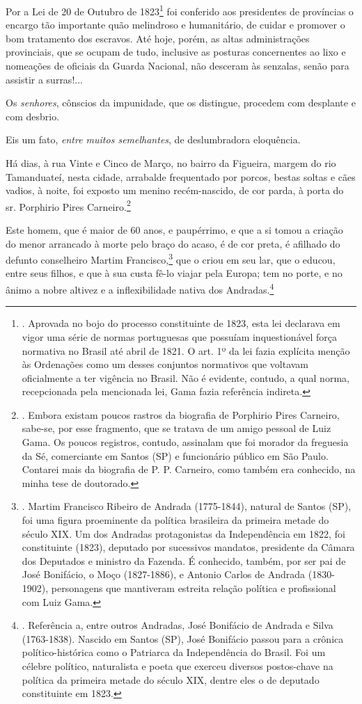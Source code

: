 Por a Lei de 20 de Outubro de 1823\footnote{. Aprovada no bojo do
  processo constituinte de 1823, esta lei declarava em vigor uma série
  de normas portuguesas que possuíam inquestionável força normativa no
  Brasil até abril de 1821. O art. 1º da lei fazia explícita menção às
  Ordenações como um desses conjuntos normativos que voltavam
  oficialmente a ter vigência no Brasil. Não é evidente, contudo, a qual
  norma, recepcionada pela mencionada lei, Gama fazia referência
  indireta.} foi conferido aos presidentes de províncias o encargo tão
importante quão melindroso e humanitário, de cuidar e promover o bom
tratamento dos escravos. Até hoje, porém, as altas administrações
provinciais, que se ocupam de tudo, inclusive as posturas concernentes
ao lixo e nomeações de oficiais da Guarda Nacional, não desceram às
senzalas, senão para assistir a surras!...

Os \emph{senhores}, cônscios da impunidade, que os distingue, procedem
com desplante e com desbrio.

Eis um fato, \emph{entre muitos semelhantes}, de deslumbradora
eloquência.

Há dias, à rua Vinte e Cinco de Março, no bairro da Figueira, margem do
rio Tamanduateí, nesta cidade, arrabalde frequentado por porcos, bestas
soltas e cães vadios, à noite, foi exposto um menino recém-nascido, de
cor parda, à porta do sr. Porphirio Pires Carneiro.\footnote{. Embora
  existam poucos rastros da biografia de Porphirio Pires Carneiro,
  sabe-se, por esse fragmento, que se tratava de um amigo pessoal de
  Luiz Gama. Os poucos registros, contudo, assinalam que foi morador da
  freguesia da Sé, comerciante em Santos (SP) e funcionário público em
  São Paulo. Contarei mais da biografia de P. P. Carneiro, como também
  era conhecido, na minha tese de doutorado.}

Este homem, que é maior de 60 anos, e paupérrimo, e que a si tomou a
criação do menor arrancado à morte pelo braço do acaso, é de cor preta,
é afilhado do defunto conselheiro Martim Francisco,\footnote{. Martim
  Francisco Ribeiro de Andrada (1775-1844), natural de Santos (SP), foi
  uma figura proeminente da política brasileira da primeira metade do
  século XIX. Um dos Andradas protagonistas da Independência em 1822,
  foi constituinte (1823), deputado por sucessivos mandatos, presidente
  da Câmara dos Deputados e ministro da Fazenda. É conhecido, também,
  por ser pai de José Bonifácio, o Moço (1827-1886), e Antonio Carlos de
  Andrada (1830-1902), personagens que mantiveram estreita relação
  política e profissional com Luiz Gama.} que o criou em seu lar, que o
educou, entre seus filhos, e que à sua custa fê-lo viajar pela Europa;
tem no porte, e no ânimo a nobre altivez e a inflexibilidade nativa dos
Andradas.\footnote{. Referência a, entre outros Andradas, José Bonifácio
  de Andrada e Silva (1763-1838). Nascido em Santos (SP), José Bonifácio
  passou para a crônica político-histórica como o Patriarca da
  Independência do Brasil. Foi um célebre político, naturalista e poeta
  que exerceu diversos postos-chave na política da primeira metade do
  século XIX, dentre eles o de deputado constituinte em 1823.}

